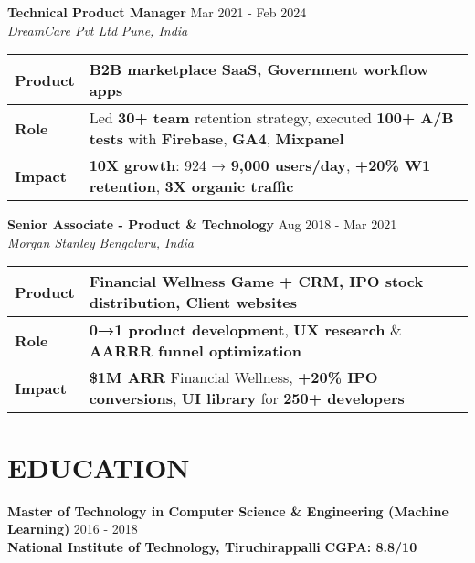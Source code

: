 \documentclass[10pt,a4paper]{article}
\newcommand{\experienceitem}[4]{
    \textbf{#1} \hfill #2 \\
    \textit{#3} \hfill \textit{#4}
}
\newcommand{\educationitem}[4]{
    \textbf{#1} \hfill #2 \\
    #3 \hfill #4
}
\begin{document}
\vspace{12pt}

\experienceitem{\textbf{Technical Product Manager}}{Mar 2021 - Feb 2024}{DreamCare Pvt Ltd}{Pune, India}

{\renewcommand{\arraystretch}{1.2}
\begin{tabularx}{\textwidth}{|>{\raggedright\arraybackslash}p{1.8cm}|X|}
\hline
\textbf{Product} & \textbf{B2B marketplace SaaS}, Government \textbf{workflow apps} \\
\hline
\textbf{Role} & Led \textbf{30+ team} retention strategy, executed \textbf{100+ A/B tests} with \textbf{Firebase}, \textbf{GA4}, \textbf{Mixpanel} \\
\hline
\textbf{Impact} & \textbf{10X growth}: 924 → \textbf{9,000 users/day}, \textbf{+20\% W1 retention}, \textbf{3X organic traffic} \\
\hline
\end{tabularx}}

\vspace{12pt}

\experienceitem{\textbf{Senior Associate - Product \& Technology}}{Aug 2018 - Mar 2021}{Morgan Stanley}{Bengaluru, India}

{\renewcommand{\arraystretch}{1.2}
\begin{tabularx}{\textwidth}{|>{\raggedright\arraybackslash}p{1.8cm}|X|}
\hline
\textbf{Product} & \textbf{Financial Wellness} Game + \textbf{CRM}, \textbf{IPO} stock distribution, Client websites \\
\hline
\textbf{Role} & \textbf{0→1 product development}, \textbf{UX research} \& \textbf{AARRR funnel optimization} \\
\hline
\textbf{Impact} & \textbf{\$1M ARR} Financial Wellness, \textbf{+20\% IPO conversions}, \textbf{UI library} for \textbf{250+ developers} \\
\hline
\end{tabularx}}

\vspace{12pt}
\section{EDUCATION}

\educationitem{\textbf{Master of Technology} in \textbf{Computer Science \& Engineering (Machine Learning)}}{2016 - 2018}{\textbf{National Institute of Technology, Tiruchirappalli}}{\textbf{CGPA: 8.8/10}}

\vspace{12pt}
\end{document}
